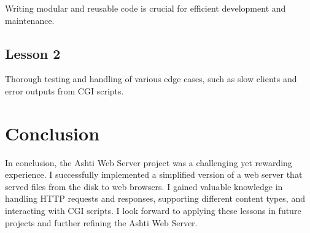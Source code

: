 \documentclass{article}
\begin{document}
Writing modular and reusable code is crucial for efficient development and maintenance.


\subsection*{Lesson 2}

Thorough testing and handling of various edge cases, such as slow clients and error outputs from CGI scripts.

\section*{Conclusion}

In conclusion, the Ashti Web Server project was a challenging yet rewarding experience. I successfully implemented a simplified version of a web server that served files from the disk to web browsers. I gained valuable knowledge in handling HTTP requests and responses, supporting different content types, and interacting with CGI scripts. I look forward to applying these lessons in future projects and further refining the Ashti Web Server.
\end{document}
